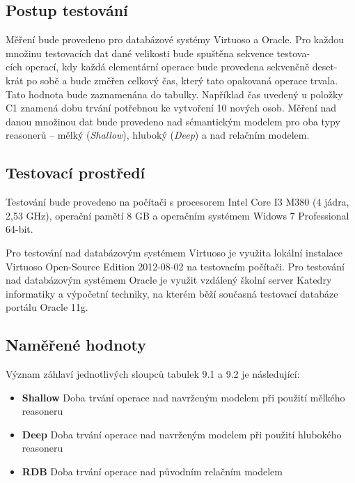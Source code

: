 \documentclass{projekt}
\begin{document}
\subsection{Postup testování}
\hspace{0.65cm}Měření bude provedeno pro databázové systémy Virtuoso a Oracle. Pro každou množinu testovacích dat dané velikosti bude spuštěna sekvence testova-\\cích operací, kdy každá elementární operace bude provedena sekvenčně deset-\\krát po sobě a bude změřen celkový čas, který tato opakovaná operace trvala. Tato hodnota bude zaznamenána do tabulky. Například čas uvedený u položky C1 znamená dobu trvání potřebnou ke vytvoření 10 nových osob.
Měření nad danou množinou dat bude provedeno nad sémantickým modelem pro oba typy reasonerů – mělký ({\it Shallow}), hluboký ({\it Deep}) a nad relačním modelem.

\subsection{Testovací prostředí}
\hspace{0.65cm}Testování bude provedeno na počítači s procesorem Intel Core I3 M380 (4 jádra, 2,53 GHz), operační pamětí 8 GB a operačním systémem Widows 7 Professional 64-bit.

Pro testování nad databázovým systémem Virtuoso je využita lokální instalace Virtuoso Open-Source Edition 2012-08-02 na testovacím počítači. Pro testování nad databázovým systémem Oracle je využit vzdálený školní server Katedry informatiky a výpočetní techniky, na kterém běží současná testovací databáze portálu Oracle 11g.

\subsection{Naměřené hodnoty}

Význam záhlaví jednotlivých sloupců tabulek 9.1 a 9.2 je následující:

\begin{itemize}
\item {\bf Shallow} Doba trvání operace nad navrženým modelem při použití mělkého reasoneru
\item {\bf Deep} Doba trvání operace nad navrženým modelem při použití hlubokého reasoneru
\item {\bf RDB} Doba trvání operace nad původním relačním modelem
\end{itemize}
\end{document}
